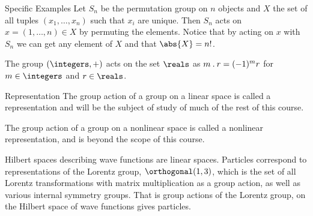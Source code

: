 \begin{exm}{Specific Examples}{}
    Let \(S_n\) be the permutation group on \(n\) objects and \(X\) the set of all tuples \((x_1, \dotsc, x_n)\) such that \(x_i\) are unique.
    Then \(S_n\) acts on \(x = (1, \dotsc, n)\in X\) by permuting the elements.
    Notice that by acting on \(x\) with \(S_n\) we can get any element of \(X\) and that \(\abs{X} = n!\).
    
    The group \((\integers, +)\) acts on the set \(\reals\) as \(m\mathbin{.} r = (-1)^{m}r\) for \(m \in \integers\) and \(r\in \reals\).
\end{exm}

\begin{exm}{Representation}{}
    The group action of a group on a linear space is called a representation and will be the subject of study of much of the rest of this course.
    
    The group action of a group on a nonlinear space is called a nonlinear representation, and is beyond the scope of this course.
\end{exm}

\begin{app}{}{}
    Hilbert spaces describing wave functions are linear spaces.
    Particles correspond to representations of the Lorentz group, \(\orthogonal(1, 3)\), which is the set of all Lorentz transformations with matrix multiplication as a group action, as well as various internal symmetry groups.
    That is group actions of the Lorentz group, on the Hilbert space of wave functions gives particles.
\end{app}

